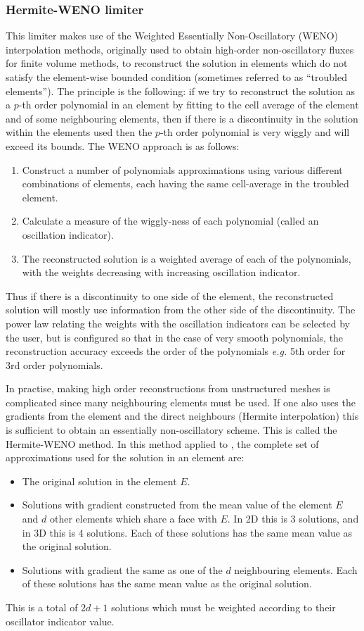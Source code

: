 \subsubsection{Hermite-WENO limiter}
\label{sect:ND_hermite_weno_limiter}
This limiter makes use of the Weighted Essentially Non-Oscillatory
(WENO) interpolation methods, originally used to obtain high-order
non-oscillatory fluxes for finite volume methods, to reconstruct the
solution in elements which do not satisfy the element-wise bounded
condition (sometimes referred to as ``troubled elements''). The
principle is the following: if we try to reconstruct the solution as a
$p$-th order polynomial in an element by fitting to the cell average
of the element and of some neighbouring elements, then if there is a
discontinuity in the solution within the elements used then the $p$-th
order polynomial is very wiggly and will exceed its bounds. The WENO
approach is as follows:
\begin{enumerate}
\item Construct a number of polynomials approximations using various
  different combinations of elements, each having the same cell-average
  in the troubled element.
\item Calculate a measure of the wiggly-ness of each polynomial (called
an oscillation indicator).
\item The reconstructed solution is a weighted average of each of the
  polynomials, with the weights decreasing with increasing oscillation
  indicator.
\end{enumerate}
Thus if there is a discontinuity to one side of the element, the
reconstructed solution will mostly use information from the other side
of the discontinuity. The power law relating the weights with the
oscillation indicators can be selected by the user, but is configured
so that in the case of very smooth polynomials, the reconstruction
accuracy exceeds the order of the polynomials \emph{e.g.} 5th order for
3rd order polynomials.

In practise, making high order reconstructions from unstructured
meshes is complicated since many neighbouring elements must be
used. If one also uses the gradients from the element and the direct
neighbours (Hermite interpolation) this is sufficient to obtain an
essentially non-oscillatory scheme. This is called the Hermite-WENO
method. In this method applied to \Pone, the complete set of
approximations used for the solution in an element are:
\begin{itemize}
\item The original solution in the element $E$.
\item Solutions with gradient constructed from the mean value of the
  element $E$ and $d$ other elements which share a face with $E$.  In
  2D this is 3 solutions, and in 3D this is 4 solutions. Each of these
  solutions has the same mean value as the original solution.
\item Solutions with gradient the same as one of the $d$ neighbouring
  elements. Each of these solutions has the same mean value as the
  original solution.
\end{itemize}
This is a total of $2d+1$ solutions which must be weighted according
to their oscillator indicator value.

